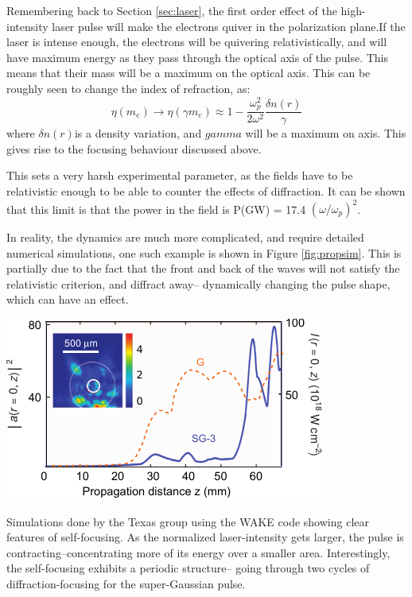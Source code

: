 \documentclass[12pt,letter]{article}
\begin{document}
Remembering back to Section \ref{sec:laser}, the first order effect of the
high-intensity laser pulse will make the electrons quiver in the polarization
plane.If the laser is intense enough, the electrons will be quivering
relativistically, and will have maximum energy as they pass through the optical
axis of the pulse. This means that their mass will be a maximum on the optical
axis. This can be roughly seen to change the index of refraction, as:
\begin{equation}
    \label{eq:indexrel}
    \eta(m_e) \rightarrow \eta(\gamma m_e) \approx
1-\frac{\omega_p^2}{2\omega^2}\frac{\delta n(r)}{\gamma}
\end{equation}
where $\delta n(r) $is a density variation, and $gamma$ will be a maximum on
axis.\cite{esarey} This gives rise to the focusing behaviour
discussed above.

This sets a very harsh experimental parameter, as the fields have to be
relativistic enough to be able to counter the effects of diffraction. It can be
shown that this limit is that the power in the field is P(GW) = 17.4
$(\omega/\omega_p)^2$\cite{esarey}.

In reality, the dynamics are much more complicated, and require detailed
numerical simulations, one such example is shown in Figure
\ref{fig:propsim}\cite{Wang2013}. This is partially due to the fact that the
front and back of the waves will not satisfy the relativistic criterion, and
diffract away-- dynamically changing the pulse shape, which can have an effect.
\begin{marginfigure}
	\includegraphics[width=\marginparwidth]{../figures/wakesimulation.pdf}
    \caption{Simulations done by the Texas group using the WAKE
        code showing clear features of self-focusing.\cite{Wang2013} As the
        normalized laser-intensity gets larger, the pulse is
        contracting--concentrating more of its energy over a smaller area.
        Interestingly, the self-focusing exhibits a periodic structure-- going
        through two cycles of diffraction-focusing for the super-Gaussian
    pulse.\label{fig:propsim}}
\end{marginfigure}
\end{document}
